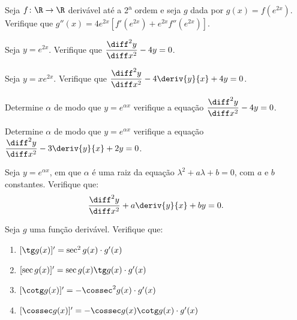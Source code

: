 \begin{exercicio}[9]
\label{ex:7.11.9}
Seja $f\colon \R \to \R$ derivável até a 2\textsuperscript{a} ordem e seja $g$ dada por $g(x) = f(e^{2x})$. Verifique que $g''(x) = 4e^{2x}[f'(e^{2x}) + e^{2x}f''(e^{2x})]$.
\end{exercicio}

\begin{exercicio}[10]
\label{ex:7.11.10}
Seja $y = e^{2x}$. Verifique que $\dfrac{\diff^2 y}{\diff x^2} - 4y = 0$.
\end{exercicio}

\begin{exercicio}[11]
\label{ex:7.11.11}
Seja $y = xe^{2x}$. Verifique que $\dfrac{\diff^2 y}{\diff x^2} - 4\deriv{y}{x} + 4y = 0$.
\end{exercicio}

\begin{exercicio}[12]
\label{ex:7.11.12}
Determine $\alpha$ de modo que $y = e^{\alpha x}$ verifique a equação $\dfrac{\diff^2 y}{\diff x^2} - 4y = 0$.
\end{exercicio}

\begin{exercicio}[13]
\label{ex:7.11.13}
Determine $\alpha$ de modo que $y = e^{\alpha x}$ verifique a equação $\dfrac{\diff^2 y}{\diff x^2} - 3\deriv{y}{x} + 2y = 0$.
\end{exercicio}

\begin{exercicio}[14]
\label{ex:7.11.14}
Seja $y = e^{\alpha x}$, em que $\alpha$ é uma raiz da equação $\lambda^2 + a\lambda + b = 0$, com $a$ e $b$ constantes. Verifique que:
\[
\frac{\diff^2 y}{\diff x^2} + a\deriv{y}{x} + by = 0.
\]
\end{exercicio}

\begin{exercicio}[15]
\label{ex:7.11.15}
Seja $g$ uma função derivável. Verifique que:
\begin{enumerate}[label=\alph*)]
    \item $[\tg g(x)]' = \sec^2 g(x) \cdot g'(x)$
    \item $[\sec g(x)]' = \sec g(x)\tg g(x) \cdot g'(x)$
    \item $[\cotg g(x)]' = -\cossec^2 g(x) \cdot g'(x)$
    \item $[\cossec g(x)]' = -\cossec g(x)\cotg g(x) \cdot g'(x)$
\end{enumerate}
\end{exercicio}

